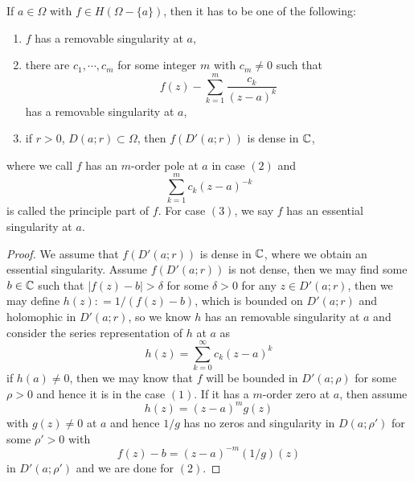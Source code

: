 \begin{theorem}
    If $a \in \Omega$ with $f\in H(\Omega-\{a\})$, then it has to be one of the following:
    \begin{enumerate}
        \item $f$ has a removable singularity at $a$,
        \item there are $c_1,\cdots,c_m$ for some integer $m$ with $c_m \neq 0$ such  that
        \[
        f(z) - \sum\limits_{k=1}^m \dfrac{c_k}{(z-a)^k}
        \]
        has a removable singularity at $a$,
        \item if $r>0$, $D(a;r) \subset \Omega$, then $f(D'(a;r))$ is dense in $\mathbb{C}$,
    \end{enumerate}
    where we call $f$ has an $m$-order pole at $a$ in case $(2)$ and
    \[
    \sum\limits_{k=1}^m c_k(z-a)^{-k}
    \]
    is called the principle part of $f$. For case $(3)$, we say $f$ has an essential singularity at $a$.
\end{theorem}
\begin{proof}
    We assume that $f(D'(a;r))$ is dense in $\mathbb{C}$, where we obtain an essential singularity. Assume $f(D'(a;r))$ is not dense, then we may find some $b \in \mathbb{C}$ such that $|f(z) - b| > \delta$ for some $\delta > 0$ for any $z\in D'(a;r)$, then we may define $h(z): = 1/(f(z)-b)$, which is bounded on $D'(a;r)$ and holomophic in $D'(a;r)$, so we know $h$ has an removable singularity at $a$ and consider the series representation of $h$ at $a$ as
    \[
    h(z) = \sum\limits_{k=0}^{\infty} c_k(z-a)^k
    \]
    if $h(a) \neq 0$, then we may know that $f$ will be bounded in $D'(a;\rho)$ for some $\rho > 0$ and hence it is in the case $(1)$. If it has a $m$-order zero at $a$, then assume
    \[
    h(z) = (z-a)^mg(z)
    \]
    with $g(z) \neq 0$ at $a$ and hence $1/g$ has no zeros and singularity in $D(a;\rho')$ for some $\rho' > 0$ with
    \[
    f(z) - b = (z-a)^{-m}(1/g)(z)
    \]
    in $D'(a;\rho')$ and we are done for $(2)$.
\end{proof}

